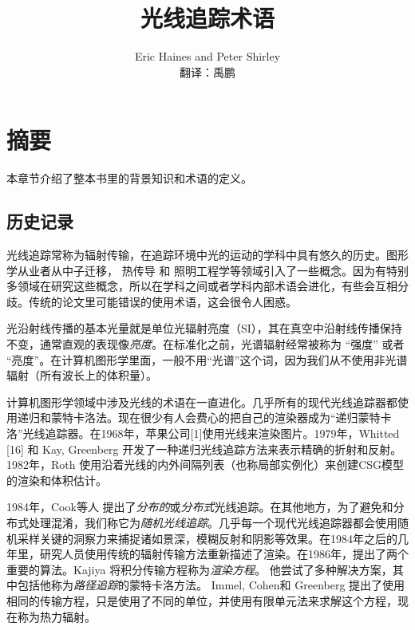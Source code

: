 \documentclass[12pt]{article}
\begin{document}
 
 
 
\title{光线追踪术语}%
\author{Eric Haines and Peter Shirley \\
	翻译：禹鹏} 
 
\maketitle
 \tableofcontents
 
 \section{摘要}
 本章节介绍了整本书里的背景知识和术语的定义。
 \subsection{历史记录}
 光线追踪常称为辐射传输，在追踪环境中光的运动的学科中具有悠久的历史。图形学从业者从中子迁移\cite{Arvo:1990:PTI:97880.97886}， 热传导\cite{siegel1981thermal} 和 照明工程学\cite{Larson:1998:RRA:286090}等领域引入了一些概念。因为有特别多领域在研究这些概念，所以在学科之间或者学科内部术语会进化，有些会互相分歧。传统的论文里可能错误的使用术语，这会很令人困惑。
 
 光沿射线传播的基本光量就是单位光辐射亮度（SI），其在真空中沿射线传播保持不变，通常直观的表现像\textit{亮度}。在标准化之前，光谱辐射经常被称为 “强度” 或者 “亮度”。在计算机图形学里面，一般不用“光谱”这个词，因为我们从不使用非光谱辐射（所有波长上的体积量）。
 
 计算机图形学领域中涉及光线的术语在一直进化。几乎所有的现代光线追踪器都使用递归和蒙特卡洛法。现在很少有人会费心的把自己的渲染器成为“递归蒙特卡洛”光线追踪器。在1968年，苹果公司[1]使用光线来渲染图片。1979年，Whitted [16] 和 Kay, Greenberg \cite{Whitted:1980:IIM:358876.358882}开发了一种递归光线追踪方法来表示精确的折射和反射。1982年，Roth \cite{ROTH1982109} 使用沿着光线的内外间隔列表（也称局部实例化）来创建CSG模型的渲染和体积估计。
 
 1984年，Cook等人\cite{Cook:1984:DRT:964965.808590} 提出了\textit{分布的}或\textit{分布式}光线追踪。在其他地方，为了避免和分布式处理混淆，我们称它为\textit{随机光线追踪}。几乎每一个现代光线追踪器都会使用随机采样关键的洞察力来捕捉诸如景深，模糊反射和阴影等效果。在1984年之后的几年里，研究人员使用传统的辐射传输方法重新描述了渲染。在1986年，提出了两个重要的算法。Kajiya \cite{Kajiya:1986:RE:15922.15902} 将积分传输方程称为\textit{渲染方程}。 他尝试了多种解决方案，其中包括他称为\textit{路径追踪}的蒙特卡洛方法。 Immel, Cohen和 Greenberg\cite{Immel:1986:RMN:15922.15901} 提出了使用相同的传输方程，只是使用了不同的单位，并使用有限单元法来求解这个方程，现在称为热力辐射。
 
\end{document}
